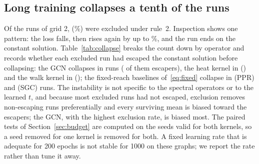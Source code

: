 \documentclass[preprint,11pt,3p]{elsarticle}
\begin{document}
\subsection{Long training collapses a tenth of the runs}
\label{sec:collapse}

Of the \numGridThreeRuns{} runs of grid 2, \numGridThreePathology{}
(\numGridThreePathologyPct\%) were excluded under rule~2. Inspection shows one pattern: the loss
falls, then rises again by up to \numGridThreeRiseMaxPct\%, and the run ends on the constant
solution. Table~\ref{tab:collapse} breaks the count down by operator and records whether each
excluded run had escaped the constant solution before collapsing: the GCN collapses in
\numCollapseGcn{} runs (\numCollapseGcnEscaped{} of them escapers), the heat kernel in
\numCollapseHeat{} (\numCollapseHeatEscaped{}) and the walk kernel in \numCollapseWalk{}
(\numCollapseWalkEscaped{}); the fixed-reach baselines of~\eqref{eq:fixed} collapse in
\numCollapsePpr{} (PPR) and \numCollapseSgc{} (SGC) runs. The instability is not specific to the
spectral operators or to the learned $t$, and because most excluded runs had not escaped, exclusion removes non-escaping runs
preferentially and every surviving mean is biased toward the escapers; the GCN, with the highest
exclusion rate, is biased most. The paired tests of Section~\ref{sec:budget} are computed on the
seeds valid for both kernels, so a seed removed for one kernel is removed for both. A fixed
learning rate that is adequate for 200 epochs is not stable for 1000 on these graphs; we report
the rate rather than tune it away.

\begin{table}[htbp]
\centering
\caption{Runs excluded as pathologies (loss rising by more than 1\% between thirds) out of
runs, 1000 epochs, submitted capacity, both tasks and all $t$ arms pooled, and whether the
excluded run had escaped the constant solution (MAE below 90\% of the constant predictor) before
collapsing.}
\label{tab:collapse}

\end{table}
\end{document}
